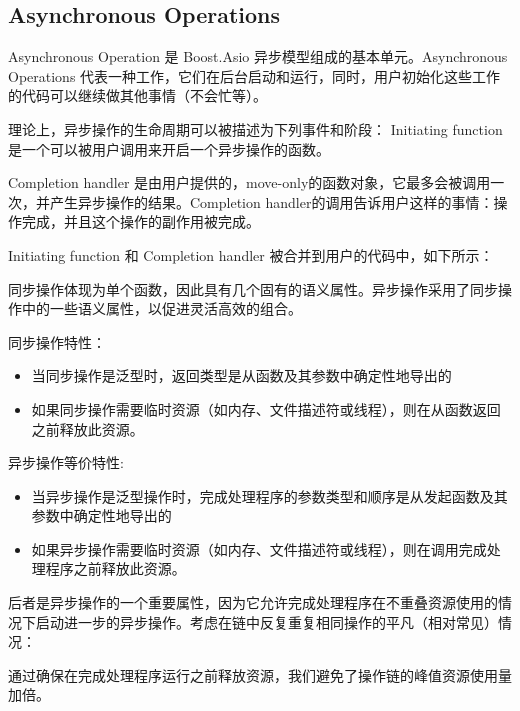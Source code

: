\subsection{Asynchronous Operations}
Asynchronous Operation 是 Boost.Asio 异步模型组成的基本单元。Asynchronous Operations 代表一种工作，它们在后台启动和运行，同时，用户初始化这些工作的代码可以继续做其他事情（不会忙等）。

理论上，异步操作的生命周期可以被描述为下列事件和阶段：
Initiating function 是一个可以被用户调用来开启一个异步操作的函数。

Completion handler 是由用户提供的，move-only的函数对象，它最多会被调用一次，并产生异步操作的结果。Completion handler的调用告诉用户这样的事情：操作完成，并且这个操作的副作用被完成。

Initiating function 和 Completion handler 被合并到用户的代码中，如下所示：

同步操作体现为单个函数，因此具有几个固有的语义属性。异步操作采用了同步操作中的一些语义属性，以促进灵活高效的组合。


同步操作特性：
\begin{itemize}
	\item 当同步操作是泛型时，返回类型是从函数及其参数中确定性地导出的
	\item 如果同步操作需要临时资源（如内存、文件描述符或线程），则在从函数返回之前释放此资源。
\end{itemize}

异步操作等价特性:
\begin{itemize}
	\item 当异步操作是泛型操作时，完成处理程序的参数类型和顺序是从发起函数及其参数中确定性地导出的
	\item 如果异步操作需要临时资源（如内存、文件描述符或线程），则在调用完成处理程序之前释放此资源。
\end{itemize}

后者是异步操作的一个重要属性，因为它允许完成处理程序在不重叠资源使用的情况下启动进一步的异步操作。考虑在链中反复重复相同操作的平凡（相对常见）情况：

通过确保在完成处理程序运行之前释放资源，我们避免了操作链的峰值资源使用量加倍。
